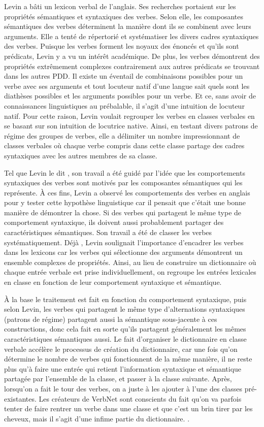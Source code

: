 Levin a bâti un lexicon verbal de l'anglais. Ses recherches portaient sur les propriétés sémantiques et syntaxiques des verbes. Selon elle, les composantes sémantiques des verbes déterminent  la manière dont ils se combinent avec leurs arguments. Elle a tenté de répertorié et systématiser les divers cadres syntaxiques des verbes. Puisque les verbes forment les noyaux des énoncés et qu'ils sont prédicats, Levin y a vu un intérêt académique. De plus, les verbes démontrent des propriétés extrêmement complexes contrairement aux autres prédicats se trouvant dans les autres PDD. Il existe un éventail de combinaisons possibles pour un verbe avec ses arguments et tout locuteur natif d'une langue sait quels sont les diathèses possibles et les arguments possibles pour un verbe. Et ce, sans avoir de connaissances linguistiques au prébalable, il s'agit d'une intuition de locuteur natif. Pour cette raison, Levin voulait regrouper les verbes en classes verbales en se basant sur son intuition de locutrice native. Ainsi, en testant divers patrons de régime des groupes de verbes, elle a délimiter un nombre impressionnant de classes verbales où chaque verbe compris dans cette classe partage des cadres syntaxiques avec les autres membres de sa classe.

Tel que Levin le dit \citep{verb-classes.levin.1993}, son travail a été guidé par l'idée que les comportements syntaxiques des verbes sont motivés par les composantes sémantiques qui les représente. À ces fins, Levin a observé les comportements des verbes en anglais pour y tester cette hypothèse linguistique car il pensait que c'était une bonne manière de démontrer la chose. Si des verbes qui partagent le même type de comportement syntaxique, ils doivent aussi probablement partager des caractéristiques sémantiques. Son travail a été de classer les verbes systématiquement. Déjà , Levin soulignait l'importance d'encadrer les verbes dans les lexicons car les verbes qui sélectionne des arguments démontrent un ensemble complexes de propriétés. Ainsi, au lieu de construire un dictionnaire où chaque entrée verbale est prise individuellement, on regroupe les entrées lexicales en classe en fonction de leur comportement syntaxique et sémantique. 

À la base le traitement est fait en fonction du comportement syntaxique, puis selon Levin, les verbes qui partagent le même type d'alternations syntaxiques (patrons de régime) partagent aussi la sémantique sous-jacente à ces constructions, donc cela fait en sorte qu'ils partagent généralement les mêmes caractéristiques sémantiques aussi. Le fait d'organiser le dictionnaire en classe verbale accélère le processus de création du dictionnaire, car une fois qu'on détermine le nombre de verbes qui fonctionnent de la même manière, il ne reste plus qu'à faire une entrée qui retient l'information syntaxique et sémantique partagée par l'ensemble de la classe, et passer à la classe suivante. Après, lorsqu'on a fait le tour des verbes, on a juste à les ajouter à l'une des classes pré-existantes. Les créateurs de VerbNet sont conscients du fait qu'on va parfois tenter de faire rentrer un verbe dans une classe et que c'est un brin tirer par les cheveux, mais il s'agit d'une infime partie du dictionnaire. \citep{SchulerVerbnetBroadcoverageComprehensive2005}. 

